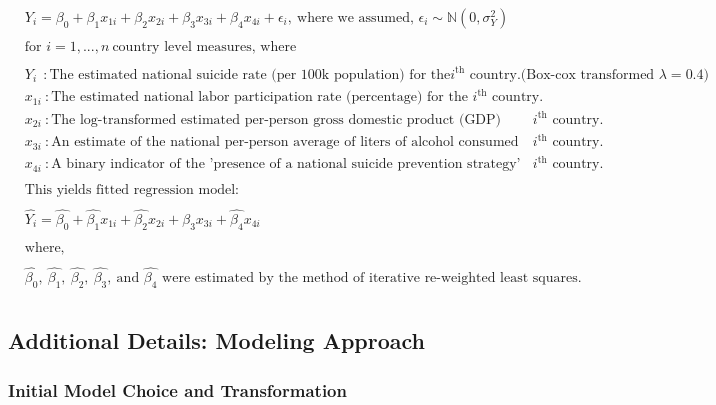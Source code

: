 \documentclass[]{article}
\begin{document}
\[
\begin{aligned}
& Y_i = \beta_0 + \beta_1 x_{1i} + \beta_2 x_{2i} + \beta_3 x_{3i} + \beta_4 x_{4i}  + \epsilon_i,\ \text{where we assumed, } \epsilon_i \sim \mathbb{N}(0,\sigma_{Y}^2) \\
&\\
&\text{for } i = 1,...,n \ \text{country level measures, where} \\
& \\
& Y_i \ \ : \text{The estimated national suicide rate (per 100k population) for the} i^{\text{th}} \text{ country.(Box-cox transformed $\lambda = 0.4$)} \\
& x_{1i}\ : \text{The estimated national labor participation rate (percentage) for the } i^{\text{th}} \text{ country.}\\
& x_{2i}\ : \text{The log-transformed estimated per-person gross domestic product (GDP) (income) for the } i^{\text{th}} \text{ country.}\\
& x_{3i}\ : \text{An estimate of the national per-person average of liters of alcohol consumed annually for the } i^{\text{th}} \text{ country.}\\
& x_{4i}\ : \text{A binary indicator of the 'presence of a national suicide prevention strategy' in 2019 for the } i^{\text{th}} \text{ country.}\\
& \\
& \text{This yields fitted regression model: } \\
& \\
& \hat{Y_i} = \hat{\beta_0} + \hat{\beta_1} x_{1i} + \hat{\beta_2} x_{2i} + \hat{\beta_3} x_{3i} + \hat{\beta_4} x_{4i} \\
& \\
& \text{where, } \\
& \\
& \hat{\beta_0},\ \hat{\beta_1},\ \hat{\beta_2},\ \hat{\beta_3}, \ \text{and } \hat{\beta_4} \text{ were estimated by the method of iterative re-weighted least squares.} \\
\end{aligned}
\]

\subsection{Additional Details: Modeling
Approach}\label{additional-details-modeling-approach}

\subsubsection{Initial Model Choice and
Transformation}\label{initial-model-choice-and-transformation}
\end{document}
